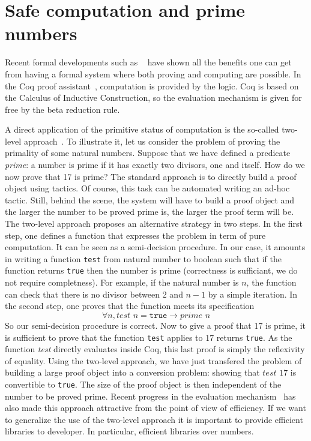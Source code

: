 

\section{Safe computation and prime numbers}

Recent formal developments such as ~\cite{4color,kepler} have shown all the benefits
one can get from having a formal system where both proving and computing are
possible. In the {\sc Coq} proof assistant~\cite{Coq}, computation is
provided by the logic. {\sc Coq} is based on the Calculus of 
Inductive Construction, so the evaluation mechanism is given for free
by the beta reduction rule. 

A direct application of the primitive status of computation is 
the so-called two-level approach~\cite{boutin}. To illustrate it, 
let us consider the problem of proving the primality of some natural 
numbers.
Suppose that we have defined a predicate {\it prime}: a number is prime 
if it has exactly two divisors, one and itself. 
How do we now prove that 17 is prime? The standard approach is to
directly build a proof object using tactics. Of course, this task can be 
automated writing an ad-hoc tactic. Still, behind the scene, the system 
will have to build a proof object and the larger the number to be proved
prime is, the larger the proof term will be.
The two-level approach proposes an alternative
strategy in two steps. In the first step, one defines a function that expresses
the problem in term of pure computation. It can be seen as a semi-decision procedure.
In our case, it amounts in writing a 
function {\tt test} from natural number to boolean such that if the function
returns {\tt true} then the number is prime (correctness is sufficiant, we do
not require completness). 
For example, if the natural number
is $n$, the function can check that there is no divisor between 2 and $n-1$
by a simple iteration. In the second step, one proves that the function meets 
its specification
$$
\forall n, \textit{test}\,\, n = \texttt{true} \rightarrow \textit{prime}\,\, n
$$
So our semi-decision procedure is correct.
Now to give a proof that 17 is prime, it is sufficient to prove that the function
{\tt test} applies to 17 returns {\tt true}. As the function {\it test} directly
evaluates inside {\sc Coq}, this last proof is simply the reflexivity of equality.
Using the two-level approach, we have just transfered the problem of building a 
large proof object into a conversion problem: showing that $test\,\, 17$ is convertible
to {\tt true}.  The size of the proof object is then independent of the number to be proved
prime. Recent progress in the evaluation mechanism~\cite{GreLer} has also made this
approach attractive from the point of view of efficiency.
If we want to generalize the use of the two-level approach it is important
to provide efficient libraries to developer. In particular, efficient libraries
over numbers.
 
